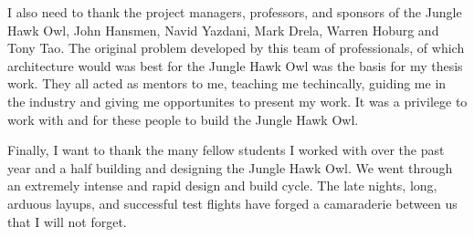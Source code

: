 I also need to thank the project managers, professors, and sponsors of the Jungle Hawk Owl, John Hansmen, Navid Yazdani, Mark Drela, Warren Hoburg and Tony Tao. 
The original problem developed by this team of professionals, of which architecture would was best for the Jungle Hawk Owl was the basis for my thesis work.
They all acted as mentors to me, teaching me techincally, guiding me in the industry and giving me opportunites to present my work. 
It was a privilege to work with and for these people to build the Jungle Hawk Owl.

Finally, I want to thank the many fellow students I worked with over the past year and a half building and designing the Jungle Hawk Owl.  
We went through an extremely intense and rapid design and build cycle. 
The late nights, long, arduous layups, and successful test flights have forged a camaraderie between us that I will not forget. 

